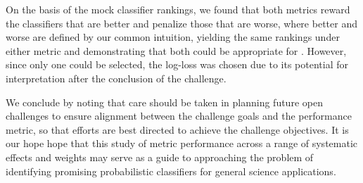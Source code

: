 On the basis of the mock classifier rankings, we found that both metrics reward the classifiers that are better and penalize those that are worse, where better and worse are defined by our common intuition, yielding the same rankings under either metric and demonstrating that both could be appropriate for \plasticc.
However, since only one could be selected, the log-loss was chosen due to its potential for interpretation after the conclusion of the challenge.


We conclude by noting that care should be taken in planning future open challenges to ensure alignment between the challenge goals and the performance metric, so that efforts are best directed to achieve the challenge objectives.
It is our hope hope that this study of metric performance across a range of systematic effects and weights may serve as a guide to approaching the problem of identifying promising probabilistic classifiers for general science applications.
